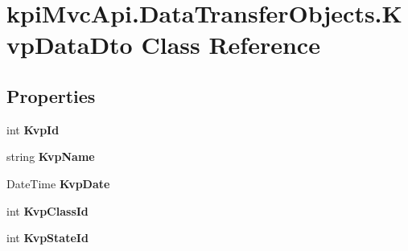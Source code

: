 \hypertarget{classkpi_mvc_api_1_1_data_transfer_objects_1_1_kvp_data_dto}{}\section{kpi\+Mvc\+Api.\+Data\+Transfer\+Objects.\+Kvp\+Data\+Dto Class Reference}
\label{classkpi_mvc_api_1_1_data_transfer_objects_1_1_kvp_data_dto}
\subsection*{Properties}
\begin{DoxyCompactItemize}
\item 
\mbox{\label{classkpi_mvc_api_1_1_data_transfer_objects_1_1_kvp_data_dto_a1103688249e2695ac1d5016f7697507e}} 
int {\bfseries Kvp\+Id}
\item 
\mbox{\label{classkpi_mvc_api_1_1_data_transfer_objects_1_1_kvp_data_dto_a67f262168594839cef344d8977cbea79}} 
string {\bfseries Kvp\+Name}
\item 
\mbox{\label{classkpi_mvc_api_1_1_data_transfer_objects_1_1_kvp_data_dto_a2cb5cacd66158e32ce2401899e72637c}} 
Date\+Time {\bfseries Kvp\+Date}
\item 
\mbox{\label{classkpi_mvc_api_1_1_data_transfer_objects_1_1_kvp_data_dto_a2587ba59c5331b2c91c96be4d3131c23}} 
int {\bfseries Kvp\+Class\+Id}
\item 
\mbox{\label{classkpi_mvc_api_1_1_data_transfer_objects_1_1_kvp_data_dto_a725acba0533573b18eade6008d609490}} 
int {\bfseries Kvp\+State\+Id}

\end{DoxyCompactItemize}
